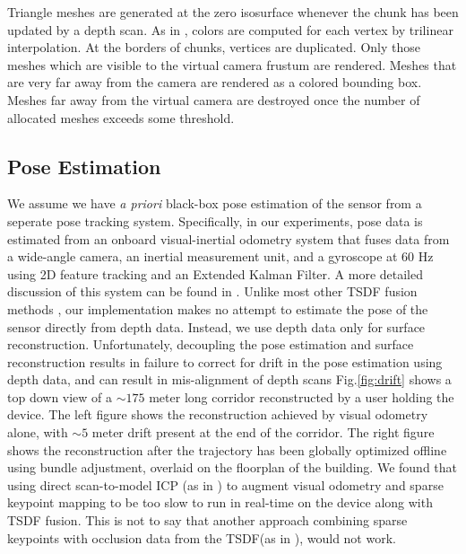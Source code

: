\documentclass[conference]{IEEEtran}
\newcommand{\figref}[1]{Fig.\ref{#1}}
\newcommand{\TSDF}{TSDF\xspace}
\begin{document}
Triangle meshes are generated at the zero isosurface whenever the chunk has been
updated by a depth scan. As in \cite{Bylow2013, Whelan2013},  colors are
computed for each vertex by trilinear interpolation. At the borders of chunks,
vertices are duplicated. Only those meshes which are visible to the virtual camera
frustum are rendered. Meshes that are very far away from the camera are
rendered as a colored bounding box. Meshes far away from the virtual camera are
destroyed once the number of allocated meshes exceeds some threshold.

\subsection{Pose Estimation}
\label{section:pose}
We assume we  have \textit{a priori} black-box pose estimation of the
sensor from a seperate pose tracking system. Specifically, in our experiments,
pose data is estimated from an onboard visual-inertial odometry system that fuses
data from a wide-angle camera, an inertial measurement unit, and a gyroscope at
60 Hz using 2D feature tracking and an Extended Kalman Filter. A more detailed
discussion of this system can be found in \cite{VINS, VINS2}.  Unlike
most other \TSDF fusion methods \cite{Newcombe, Whelan2013,
Bylow2013, NiessnerHashing} , our implementation makes no attempt to estimate
the pose of the sensor directly from depth data. Instead, we use depth data 
only for surface reconstruction. Unfortunately, decoupling the pose estimation
and surface reconstruction results in failure to correct for drift in the pose
estimation using depth data, and can result in mis-alignment of depth scans
\figref{fig:drift} shows a top down view of a $\sim
175$ meter long corridor reconstructed by a user holding the device. The
left figure shows the reconstruction achieved by visual odometry alone,
with $\sim 5$ meter drift present at the end of the corridor. The right 
figure shows the reconstruction after the trajectory has been globally
optimized offline using bundle adjustment, overlaid on the floorplan of
 the building. We found that using direct scan-to-model ICP (as in
 \cite{Newcombe}) to augment visual odometry and sparse keypoint mapping to be
 too slow to run in real-time on the device along with \TSDF fusion. This is not
 to say that another approach combining sparse keypoints with occlusion data
 from the \TSDF (as in \cite{StuecklerSparseDense}), would not work.
\end{document}
